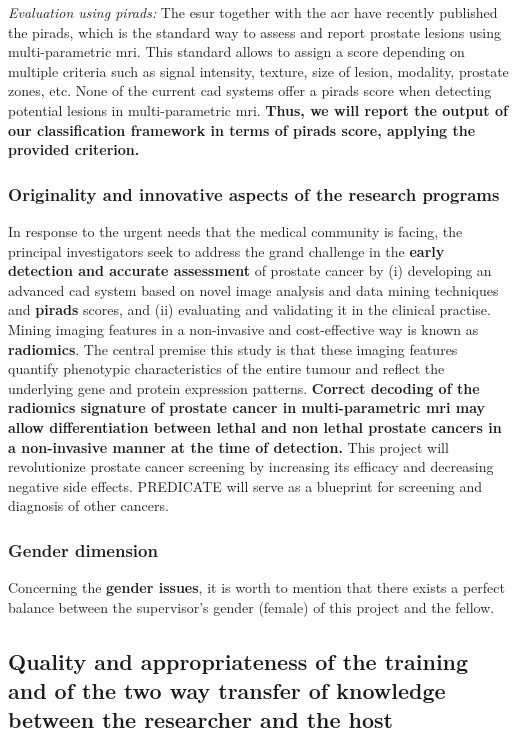 \emph{Evaluation using \acs*{pirads}:}
The \ac{esur} together with the \ac{acr} have recently published the \ac{pirads}, which is the standard way to assess and report prostate lesions using multi-parametric \ac{mri}.
This standard allows to assign a score depending on multiple criteria such as signal intensity, texture, size of lesion, modality, prostate zones, etc.
None of the current \ac{cad} systems offer a \ac{pirads} score when detecting potential lesions in multi-parametric \ac{mri}.
\textbf{Thus, we will report the output of our classification framework in terms of \ac{pirads} score, applying the provided criterion.}

\subsubsection{Originality and innovative aspects of the research programs}

In response to the urgent needs that the medical community is facing, the principal investigators seek to address the grand challenge in the \textbf{early detection and accurate assessment} of prostate cancer by (i) developing an advanced \ac{cad} system based on novel image analysis and data mining techniques and \textbf{\ac{pirads}} scores, and (ii) evaluating and validating it in the clinical practise. 
Mining imaging features in a non-invasive and cost-effective way is known as \textbf{radiomics}.
The central premise this study is that these imaging features quantify phenotypic characteristics of the entire tumour and reflect the underlying gene and protein expression patterns.
\textbf{Correct decoding of the radiomics signature of prostate cancer in multi-parametric \ac{mri} may allow differentiation between lethal and non lethal prostate cancers in a non-invasive manner at the time of detection.}
This project will revolutionize prostate cancer screening by increasing its efficacy and decreasing negative side effects.
PREDICATE will serve as a blueprint for screening and diagnosis of other cancers.

\subsubsection{Gender dimension}

Concerning the \textbf{gender issues}, it is worth to mention that there exists a perfect balance between the supervisor's gender (female) of this project and the fellow.

\subsection{Quality and appropriateness of the training and of the two way transfer of knowledge between the researcher and the host}
\label{sec:transfer}

